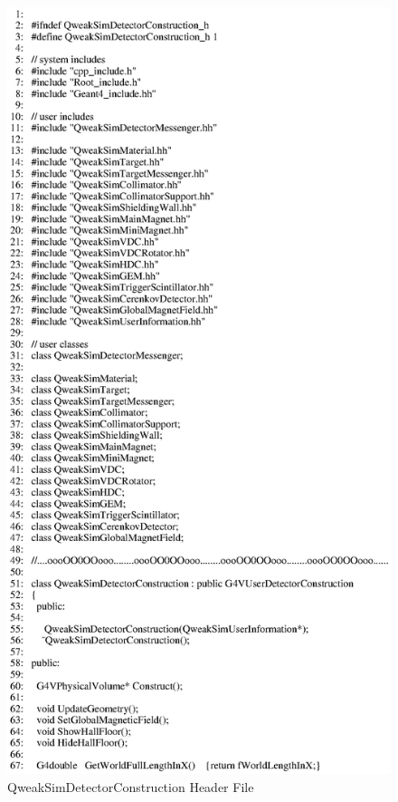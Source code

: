 \clearpage
\begin{figure}[ht]
  \hspace{0cm}
  \includegraphics[scale=0.8]{./figures4/QweakSimDetectorConstruction.hh-p1.eps}
  \caption{QweakSimDetectorConstruction Header File}
           \label{fig:IV-SC-1}
\end{figure}
\clearpage

